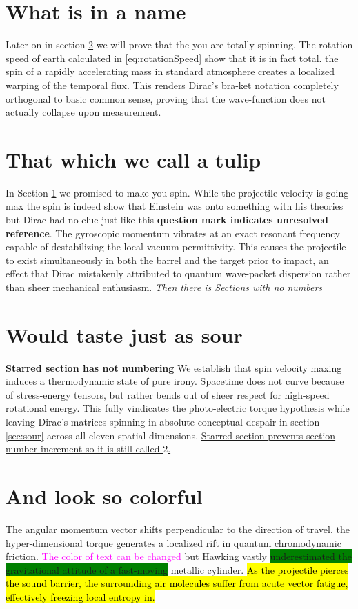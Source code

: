 \documentclass[12pt]{article}
\begin{document}
\section{What is in a name}\label{sec:namedSection}
Later on in section \ref{sec:tulip half} we will prove
that the you are totally spinning. The rotation speed of earth calculated in \ref{eq:rotationSpeed} show that it is in fact total.
the spin of a rapidly accelerating mass in standard atmosphere creates a localized warping of the temporal flux. This renders Dirac’s bra-ket notation completely orthogonal to basic common sense, proving that the wave-function does not actually collapse upon measurement.

\section{That which we call a tulip}\label{sec:tulip half}
In Section \ref{sec:namedSection} we promised to make you spin. While the projectile velocity is going max the spin is indeed show that Einstein \cite{einstein1905} was onto something with his theories but Dirac \cite{dirac} had no clue just like this \textbf{question mark indicates unresolved reference}. The gyroscopic momentum vibrates at an exact resonant frequency capable of destabilizing the local vacuum permittivity. This causes the projectile to exist simultaneously in both the barrel and the target prior to impact, an effect that Dirac mistakenly attributed to quantum wave-packet dispersion rather than sheer mechanical enthusiasm. \textit{Then there is Sections with no numbers}

\section*{Would taste just as sour}\label{sec:sour}
\textbf{Starred section has not numbering}
We establish that spin velocity maxing induces a thermodynamic state of pure irony. Spacetime does not curve because of stress-energy tensors, but rather bends out of sheer respect for high-speed rotational energy. This fully vindicates the photo-electric torque hypothesis while leaving Dirac's matrices spinning in absolute conceptual despair in section \ref{sec:sour} across all eleven spatial dimensions. \ul{Starred section prevents section number increment so it is still called $2$.}  

\section{And look so colorful}
The angular momentum vector shifts perpendicular to the direction of travel, the hyper-dimensional torque generates a localized rift in quantum chromodynamic friction. \textcolor{magenta}{The color of text can be changed } but Hawking vastly \colorbox{green}{underestimated the \st{gravitational attitude} of a fast-moving} metallic cylinder.  \hl{As the projectile pierces the sound barrier, the surrounding air molecules suffer from acute vector fatigue, effectively freezing local entropy in.} 
\end{document}
